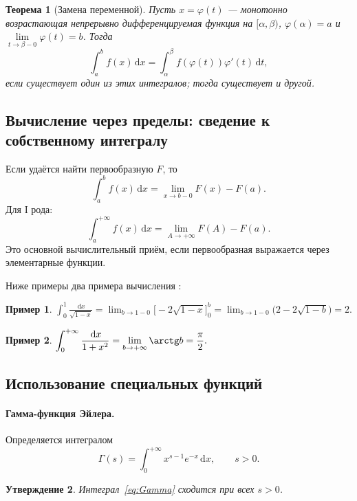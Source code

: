 \documentclass[coursework, och, times]{SCWorks1}
\newtheorem{theorem}{Теорема}
\newtheorem{proposition}[theorem]{Утверждение}
\newtheorem{example}{Пример}
\newcommand{\dd}{\,\mathrm{d}}
\begin{document}
\begin{theorem}[Замена переменной]
Пусть \(x=\varphi(t)\) — монотонно возрастающая непрерывно дифференцируемая функция на \([\alpha,\beta)\), \(\varphi(\alpha)=a\) и\\ \(\lim\limits_{t\to\beta-0}\varphi(t)=b\). Тогда
\[
\int_a^b f(x)\dd x=\int_\alpha^\beta f(\varphi(t))\varphi'(t)\dd t,
\]
если существует один из этих интегралов; тогда существует и другой.
\end{theorem}


\subsection{Вычисление через пределы: сведение к собственному интегралу}

Если удаётся найти первообразную \(F\), то
\[
\int_a^b f(x)\dd x=\lim_{x\to b-0}F(x)-F(a).
\]
Для I рода:
\[
\int_a^{+\infty}f(x)\dd x=\lim_{A\to+\infty}F(A)-F(a).
\]
Это основной вычислительный приём, если первообразная выражается через элементарные функции.

Ниже примеры два примера вычисления \cite{demidovich}:
\begin{example}
$\displaystyle\int_0^1\frac{\dd x}{\sqrt{1-x}} = \lim_{b\to1-0}\bigl[-2\sqrt{1-x}\bigr]_0^b = \lim_{b\to1-0}\bigl(2-2\sqrt{1-b}\bigr)=2.$
\end{example}

\begin{example}
$\displaystyle\int_0^{+\infty}\frac{\dd x}{1+x^2}=\lim_{b\to+\infty}\arctg b = \frac{\pi}{2}.$
\end{example}


\subsection{Использование специальных функций}

\paragraph{Гамма-функция Эйлера.} Определяется интегралом \cite{zorich2}
\begin{equation}\label{eq:Gamma}
\Gamma(s)=\int_0^{+\infty}x^{s-1}e^{-x}\dd x,\qquad s>0.
\end{equation}

\begin{proposition}
Интеграл~\eqref{eq:Gamma} сходится при всех $s>0$.
\end{proposition}
\end{document}
